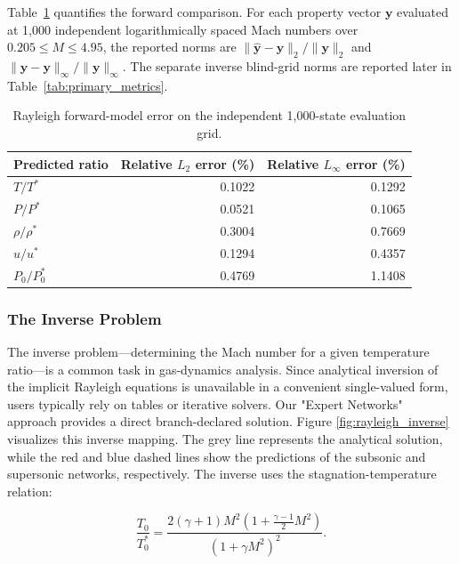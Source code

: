 \documentclass[preprint,12pt]{elsarticle}
\newcommand{\rev}[1]{#1}
\newenvironment{revision}{}{}
\newcommand{\rev}[1]{\textcolor{revisionblue}{#1}}
\newenvironment{revision}{\color{revisionblue}}{}
\begin{document}
\begin{revision}
Table~\ref{tab:rayleigh_forward_error} quantifies the forward comparison. For each property vector $\mathbf y$ evaluated at 1,000 independent logarithmically spaced Mach numbers over $0.205\le M\le4.95$, the reported norms are $\|\widehat{\mathbf y}-\mathbf y\|_2/\|\mathbf y\|_2$ and $\|\widehat{\mathbf y}-\mathbf y\|_\infty/\|\mathbf y\|_\infty$. The separate inverse blind-grid norms are reported later in Table~\ref{tab:primary_metrics}.

\begin{table}[H]
\centering
\caption{Rayleigh forward-model error on the independent 1,000-state evaluation grid.}
\label{tab:rayleigh_forward_error}
\small
\begin{tabular}{lrr}
\toprule
Predicted ratio & Relative $L_2$ error (\%) & Relative $L_\infty$ error (\%) \\
\midrule
$T/T^*$       & 0.1022 & 0.1292 \\
$P/P^*$       & 0.0521 & 0.1065 \\
$\rho/\rho^*$ & 0.3004 & 0.7669 \\
$u/u^*$       & 0.1294 & 0.4357 \\
$P_0/P_0^*$   & 0.4769 & 1.1408 \\
\bottomrule
\end{tabular}
\end{table}
\end{revision}

\subsubsection{The Inverse Problem}
The inverse problem—determining the Mach number for a given temperature ratio—is a common task in gas-dynamics analysis. Since analytical inversion of the implicit Rayleigh equations is unavailable in a convenient single-valued form, users typically rely on tables or iterative solvers. Our "Expert Networks" approach provides a direct branch-declared solution. Figure \ref{fig:rayleigh_inverse} visualizes this inverse mapping. The grey line represents the analytical solution, while the red and blue dashed lines show the predictions of the subsonic and supersonic networks, respectively. \rev{The inverse uses the stagnation-temperature relation:}

\begin{equation}
    \frac{T_0}{T_0^*} = \frac{2(\gamma+1)M^2\left(1+\frac{\gamma-1}{2}M^2\right)}{(1+\gamma M^2)^2}.
\end{equation}
\end{document}
